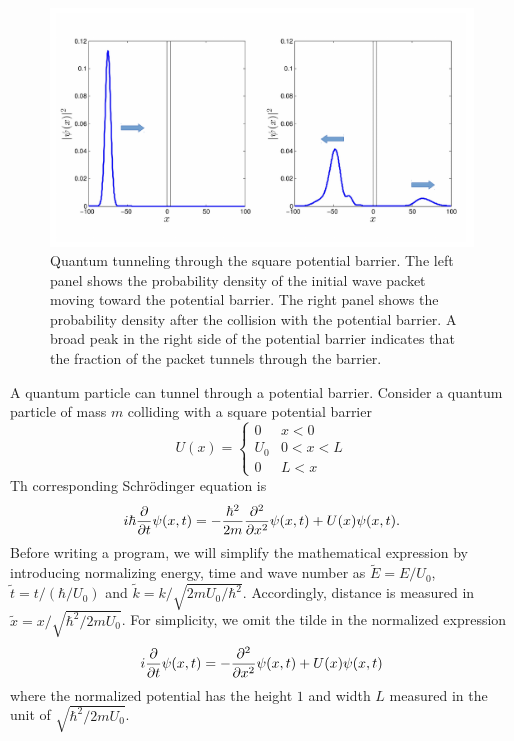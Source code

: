 \begin{figure}
\centering
\includegraphics[width=4.5in]{13.pde1/tunneling.pdf}
\caption{Quantum tunneling through the square potential barrier.  The left panel shows the probability density of the initial wave packet moving toward the potential barrier.  The right panel shows the probability density after the collision with the potential barrier.  A broad peak in the right side of the potential barrier indicates that the fraction of the packet tunnels through the barrier.}
\label{fig:tunneling}
\end{figure}

A quantum particle can tunnel through a potential barrier.  Consider a quantum particle of mass $m$ colliding with a square potential barrier
\begin{equation}
U(x) = \begin{cases} 0 & x<0 \\[1ex] U_0 & 0<x<L \\[1ex] 0  &L<x \end{cases}
\end{equation}
Th corresponding Schr\"{o}dinger equation is
\begin{equation}
i \hbar \pdv{t}\psi(x,t) = -\frac{\hbar^2}{2m} \pdv[2]{x} \psi(x,t) + U(x) \psi(x,t).
\end{equation}
Before writing a program, we will simplify the mathematical expression by introducing normalizing energy, time and wave number as $\tilde{E}=E/U_0$, $\tilde{t}=t/(\hbar/U_0)$ and $\tilde{k}=k/\sqrt{2 m U_0/\hbar^2}$.  Accordingly, distance is measured in $\tilde{x}=x/\sqrt{\hbar^2/2 m U_0}$.   For simplicity, we omit the tilde  in the normalized expression
\begin{equation}
i \pdv{t}\psi(x,t) = - \pdv[2]{x} \psi(x,t) + U(x) \psi(x,t)
\end{equation} 
where the normalized potential has the height $1$ and width $L$ measured in the unit of $\sqrt{\hbar^2/2 m U_0}$.

